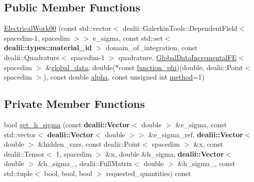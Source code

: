 \subsection*{Public Member Functions}
\begin{DoxyCompactItemize}
\item 
\hyperlink{classincremental_f_e_1_1_electrical_work00_a7b7eb8d9a23e3f8c9447c83d68ea545c}{Electrical\+Work00} (const std\+::vector$<$ dealii\+::\+Galerkin\+Tools\+::\+Dependent\+Field$<$ spacedim-\/1, spacedim $>$$>$ e\+\_\+sigma, const std\+::set$<$ {\bf dealii\+::types\+::material\+\_\+id} $>$ domain\+\_\+of\+\_\+integration, const dealii\+::\+Quadrature$<$ spacedim-\/1 $>$ quadrature, \hyperlink{classincremental_f_e_1_1_global_data_incremental_f_e}{Global\+Data\+Incremental\+FE}$<$ spacedim $>$ \&\hyperlink{classincremental_f_e_1_1_electrical_work00_aa265094f77f4b0cf74ebb25f6b6bdc9f}{global\+\_\+data}, double($\ast$const \hyperlink{classincremental_f_e_1_1_electrical_work00_aa529e919f57a2cb3c6a6d63014431b9c}{function\+\_\+phi})(double, dealii\+::\+Point$<$ spacedim $>$), const double \hyperlink{classincremental_f_e_1_1_electrical_work00_a932398e0ec8ba1599cbb6cb1cdb0bdbc}{alpha}, const unsigned int \hyperlink{classincremental_f_e_1_1_electrical_work00_a6730746f75d7d3ebae632da3e7fd68d5}{method}=1)
\end{DoxyCompactItemize}
\subsection*{Private Member Functions}
\begin{DoxyCompactItemize}
\item 
bool \hyperlink{classincremental_f_e_1_1_electrical_work00_a7684d818dd3288b1d8d7160b25df6b23}{get\+\_\+h\+\_\+sigma} (const {\bf dealii\+::\+Vector}$<$ double $>$ \&e\+\_\+sigma, const std\+::vector$<$ {\bf dealii\+::\+Vector}$<$ double $>$$>$ \&e\+\_\+sigma\+\_\+ref, {\bf dealii\+::\+Vector}$<$ double $>$ \&hidden\+\_\+vars, const dealii\+::\+Point$<$ spacedim $>$ \&x, const dealii\+::\+Tensor$<$ 1, spacedim $>$ \&n, double \&h\+\_\+sigma, {\bf dealii\+::\+Vector}$<$ double $>$ \&h\+\_\+sigma\+\_, dealii\+::\+Full\+Matrix$<$ double $>$ \&h\+\_\+sigma\+\_, const std\+::tuple$<$ bool, bool, bool $>$ requested\+\_\+quantities) const 
\end{DoxyCompactItemize}
